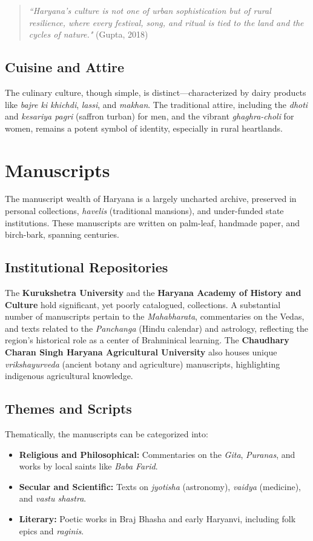 \documentclass[12pt]{article}
\begin{document}
\begin{quote}
\textit{``Haryana's culture is not one of urban sophistication but of rural resilience, where every festival, song, and ritual is tied to the land and the cycles of nature."} (Gupta, 2018)
\end{quote}

\subsection{Cuisine and Attire}
The culinary culture, though simple, is distinct—characterized by dairy products like \textit{bajre ki khichdi}, \textit{lassi}, and \textit{makhan}. The traditional attire, including the \textit{dhoti} and \textit{kesariya pagri} (saffron turban) for men, and the vibrant \textit{ghaghra-choli} for women, remains a potent symbol of identity, especially in rural heartlands.

\section{Manuscripts}
The manuscript wealth of Haryana is a largely uncharted archive, preserved in personal collections, \textit{havelis} (traditional mansions), and under-funded state institutions. These manuscripts are written on palm-leaf, handmade paper, and birch-bark, spanning centuries.

\subsection{Institutional Repositories}
The \textbf{Kurukshetra University} and the \textbf{Haryana Academy of History and Culture} hold significant, yet poorly catalogued, collections. A substantial number of manuscripts pertain to the \textit{Mahabharata}, commentaries on the Vedas, and texts related to the \textit{Panchanga} (Hindu calendar) and astrology, reflecting the region's historical role as a center of Brahminical learning. The \textbf{Chaudhary Charan Singh Haryana Agricultural University} also houses unique \textit{vrikshayurveda} (ancient botany and agriculture) manuscripts, highlighting indigenous agricultural knowledge.

\subsection{Themes and Scripts}
Thematically, the manuscripts can be categorized into:
\begin{itemize}
    \item \textbf{Religious and Philosophical:} Commentaries on the \textit{Gita}, \textit{Puranas}, and works by local saints like \textit{Baba Farid}.
    \item \textbf{Secular and Scientific:} Texts on \textit{jyotisha} (astronomy), \textit{vaidya} (medicine), and \textit{vastu shastra}.
    \item \textbf{Literary:} Poetic works in Braj Bhasha and early Haryanvi, including folk epics and \textit{raginis}.
\end{itemize}
\end{document}

